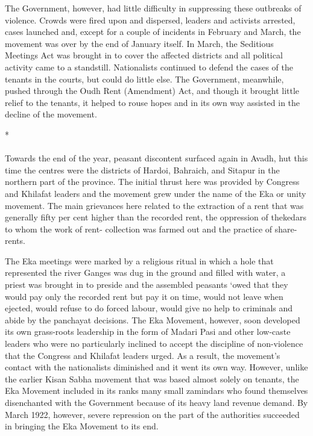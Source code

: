 The Government, however, had little difficulty in suppressing these outbreaks of violence. Crowds were fired upon and dispersed, leaders and activists arrested, cases launched and, except for a couple of incidents in February and March, the movement was over by the end of January itself. In March, the Seditious Meetings Act was brought in to cover the affected districts and all political activity came to a standstill. Nationalists continued to defend the cases of the tenants in the courts, but could do little else. The Government, meanwhile, pushed through the Oudh Rent (Amendment) Act, and though it brought little relief to the tenants, it helped to rouse hopes and in its own way assisted in the decline of the movement.

\begin{center}*\end{center}

\paragraph*{}


Towards the end of the year, peasant discontent surfaced again in Avadh, hut this time the centres were the districts of Hardoi, Bahraich, and Sitapur in the northern part of the province. The initial thrust here was provided by Congress and Khilafat leaders and the movement grew under the name of the Eka or unity movement. The main grievances here related to the extraction of a rent that was generally fifty per cent higher than the recorded rent, the oppression of thekedars to whom the work of rent- collection was farmed out and the practice of share-rents.

The Eka meetings were marked by a religious ritual in which a hole that represented the river Ganges was dug in the ground and filled with water, a priest was brought in to preside and the assembled peasants `owed that they would pay only the recorded rent but pay it on time, would not leave when ejected, would refuse to do forced labour, would give no help to criminals and abide by the panchayat decisions. The Eka Movement, however, soon developed its own grass-roots leadership in the form of Madari Pasi and other low-caste leaders who were no particularly inclined to accept the discipline of non-violence that the Congress and Khilafat leaders urged. As a result, the movement's contact with the nationalists diminished and it went its own way. However, unlike the earlier Kisan Sabha movement that was based almost solely on tenants, the Eka Movement included in its ranks many small zamindars who found themselves disenchanted with the Government because of its heavy land revenue demand. By March 1922, however, severe repression on the part of the authorities succeeded in bringing the Eka Movement to its end.


